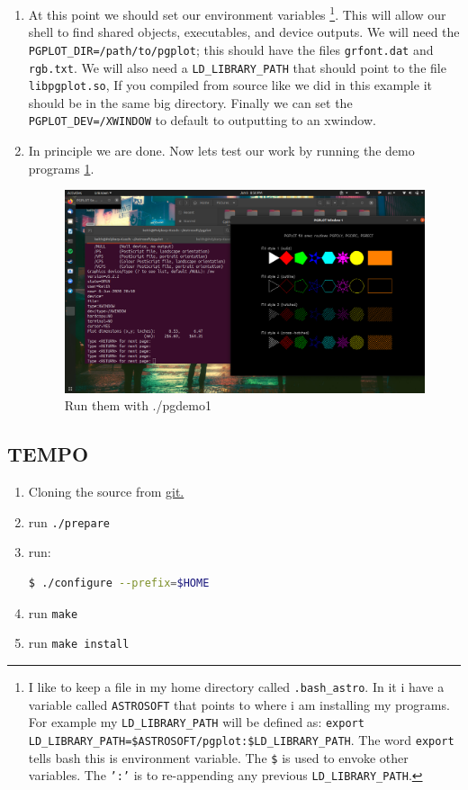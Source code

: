\documentclass{article}
\begin{document}
\begin{enumerate}
\begin{enumerate}
    			
    \item At this point we should set our environment variables 
\footnote{I like to keep a file in my home directory called \texttt{.bash\_astro}. In it i have a variable called \texttt{ASTROSOFT} that points to where i am installing my programs. For example my \texttt{LD\_LIBRARY\_PATH} will be defined as: \texttt{export LD\_LIBRARY\_PATH=\$ASTROSOFT/pgplot:\$LD\_LIBRARY\_PATH}. The word \texttt{export} tells bash this is environment variable. The \texttt{\$} is used to envoke other variables. The \texttt{':'} is to re-appending any previous \texttt{LD\_LIBRARY\_PATH}.}. 
    			This will allow our shell to find shared objects, executables, and device outputs. We will need the \texttt{PGPLOT\_DIR=/path/to/pgplot}; this should have the files \texttt{grfont.dat} and \texttt{rgb.txt}. We will also need a \texttt{LD\_LIBRARY\_PATH} that should point to the file \texttt{libpgplot.so}, If you compiled from source like we did in this example it should be in the same big directory. Finally we can set the \texttt{PGPLOT\_DEV=/XWINDOW} to default to outputting to an xwindow. 
    			
    \item In principle we are done. Now lets test our work by running the demo programs \ref{fig:sucesfful-pgplot-install}.  
\begin{figure}[h]
\includegraphics[width=\linewidth]{Images/sucesfful-pgplot-install.png}
\caption{Run them with ./pgdemo1}
\label{fig:sucesfful-pgplot-install}  			
\end{figure}    	
\end{enumerate}   		
\end{enumerate}
    	
\subsection{TEMPO}
\begin{enumerate}
    \item Cloning the source from \href{git://git.code.sf.net/p/tempo/tempo}{git.}
    \item run \texttt{./prepare}
    \item run: \noindent \begin{lstlisting}[language=bash]
    $ ./configure --prefix=$HOME
    \end{lstlisting} 
    \item run \texttt{make}
    \item run \texttt{make install}
\end{enumerate}
\end{document}
